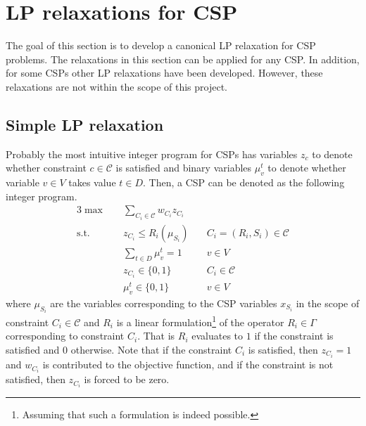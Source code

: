 \section{LP relaxations for CSP}
The goal of this section is to develop a canonical LP relaxation for CSP problems. The relaxations in this section can be applied for any CSP. 
In addition, for some CSPs other LP relaxations have been developed. However, these relaxations are not within the scope of this project.

\subsection{Simple LP relaxation}
Probably the most intuitive integer program for CSPs has variables $z_c$ to denote whether constraint $c \in \mathcal{C}$ is satisfied and binary variables $\mu_v^t$ to denote whether variable $v \in V$ takes value $t \in D$. 
Then, a CSP can be denoted as the following integer program.
\begin{alignat}{3}
	\max \quad & \sum_{C_i \in \mathcal{C}}w_{C_i} z_{C_i} & \label{eq:lp_weak}\\
	\text{s.t.} \quad & z_{C_i} \le R_{i}( \mu_{S_i} ) & \quad C_i = (R_i, S_i) \in \mathcal{C} \nonumber \\
	& \sum_{t \in D} \mu_v^t = 1 & \quad v \in V \nonumber\\
	& z_{C_i} \in \{0,1\} & \quad {C_i} \in \mathcal{C} \nonumber\\
	&	\mu_v^t \in \{0,1\}	& \quad v \in  V \nonumber
\end{alignat}
where $\mu_{S_i}$ are the variables corresponding to the CSP variables $x_{S_i}$ in the scope of constraint ${C_i} \in \mathcal{C}$ and $R_i$ is a linear formulation\footnote{Assuming that such a formulation is indeed possible.} of the operator $R_i \in \Gamma$ corresponding to constraint $C_i$. 
That is $R_i$ evaluates to $1$ if the constraint is satisfied and $0$ otherwise. 
Note that if the constraint ${C_i}$ is satisfied, then $z_{C_i} = 1$ and $w_{C_i}$ is contributed to the objective function, and if the constraint is not satisfied, then $z_{C_i}$ is forced to be zero. 

